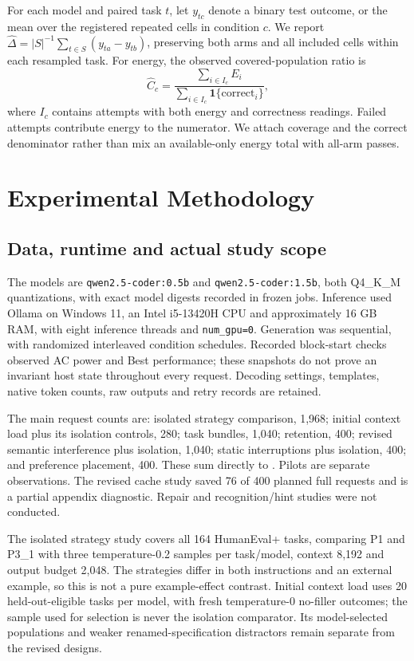 \documentclass[10pt,a4paper,twocolumn]{article}
\begin{document}
For each model and paired task $t$, let $y_{tc}$ denote a binary test outcome,
or the mean over the registered repeated cells in condition $c$. We report
$\widehat\Delta=|S|^{-1}\sum_{t\in S}(y_{ta}-y_{tb})$, preserving both arms
and all included cells within each resampled task. For energy, the observed
covered-population ratio is
\begin{equation}
\widehat C_c=\frac{\sum_{i\in I_c}E_i}{\sum_{i\in I_c}\mathbf{1}\{\text{correct}_i\}},
\end{equation}
where $I_c$ contains attempts with both energy and correctness readings. Failed
attempts contribute energy to the numerator. We attach coverage and the correct
denominator rather than mix an available-only energy total with all-arm passes.

\section{Experimental Methodology}
\subsection{Data, runtime and actual study scope}
The models are \texttt{qwen2.5-coder:0.5b} and
\texttt{qwen2.5-coder:1.5b}, both Q4\_K\_M quantizations, with exact model
digests recorded in frozen jobs. Inference used Ollama on Windows 11, an Intel
i5-13420H CPU and approximately 16 GB RAM, with eight inference threads and
\texttt{num\_gpu=0}. Generation was sequential, with randomized interleaved
condition schedules. Recorded block-start checks observed AC power and Best
performance; these snapshots do not prove an invariant host state throughout
every request. Decoding settings, templates, native token counts, raw outputs
and retry records are retained.

The main request counts are: isolated strategy comparison, 1,968; initial
context load plus its isolation controls, 280; task bundles, 1,040; retention,
400; revised semantic interference plus isolation, 1,040; static interruptions
plus isolation, 400; and preference placement, 400. These sum directly to
\MainRequests{}. Pilots are separate observations. The revised cache study
saved 76 of 400 planned full requests and is a partial appendix diagnostic.
Repair and recognition/hint studies were not conducted.

The isolated strategy study covers all 164 HumanEval+ tasks, comparing P1 and
P3\_1 with three temperature-0.2 samples per task/model, context 8,192 and output
budget 2,048. The strategies differ in both instructions and an external
example, so this is not a pure example-effect contrast. Initial context load
uses 20 held-out-eligible tasks per model, with fresh temperature-0
no-filler outcomes; the sample used for selection is never the isolation
comparator. Its model-selected populations and weaker renamed-specification
distractors remain separate from the revised designs.
\end{document}
